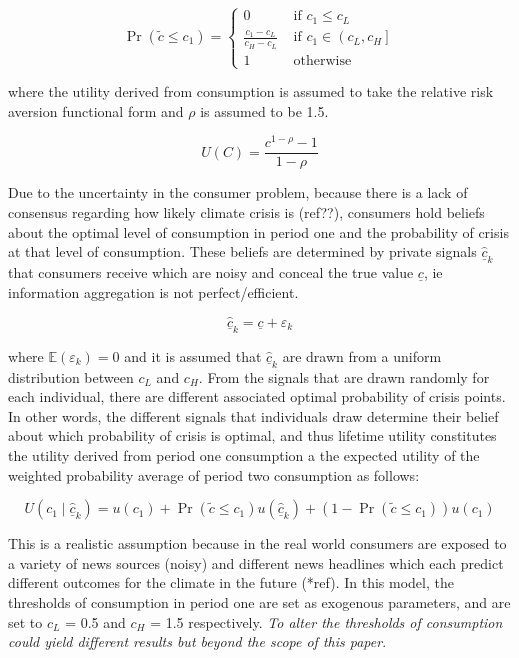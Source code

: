 \documentclass[11pt,preprint, authoryear]{elsarticle}
\numberwithin{equation}{section}
\numberwithin{figure}{section}
\numberwithin{table}{section}
\begin{document}
\[
\operatorname{Pr}\left(\tilde{c} \leq c_1\right)=\left\{\begin{array}{cc}
0 & \text { if } c_1 \leq c_L \\
\frac{c_1-c_L}{c_H-c_L} & \text { if } c_1 \in\left(c_L, c_H\right] \\
1 & \text { otherwise }
\end{array}\right.
\]

where the utility derived from consumption is assumed to take the
relative risk aversion functional form and \(\rho\) is assumed to be
1.5.

\[
U(C)=\frac{c^{1-\rho}-1}{1-\rho}
\]

Due to the uncertainty in the consumer problem, because there is a lack
of consensus regarding how likely climate crisis is (ref??), consumers
hold beliefs about the optimal level of consumption in period one and
the probability of crisis at that level of consumption. These beliefs
are determined by private signals \(\hat{\underline{c}}_k\) that
consumers receive which are noisy and conceal the true value
\(\underline{c}\), ie information aggregation is not perfect/efficient.

\[
\hat{\underline{c}}_k=\underline{c}+\varepsilon_k
\]

where \(\mathbb{E}\left(\varepsilon_k\right)=0\) and it is assumed that
\(\hat{\underline{c}}_k\) are drawn from a uniform distribution between
\(c_L\) and \(c_H\). From the signals that are drawn randomly for each
individual, there are different associated optimal probability of crisis
points. In other words, the different signals that individuals draw
determine their belief about which probability of crisis is optimal, and
thus lifetime utility constitutes the utility derived from period one
consumption a the expected utility of the weighted probability average
of period two consumption as follows:

\[
U\left(c_1 \mid \hat{\underline{c}}_{k}\right)=u\left(c_1\right)+\operatorname{Pr}\left(\tilde{c} \leq c_1\right) u\left(\hat{\underline{c}}_{k}\right)+\left(1-\operatorname{Pr}\left(\tilde{c} \leq c_1\right)\right) u\left(c_1\right)
\]

This is a realistic assumption because in the real world consumers are
exposed to a variety of news sources (noisy) and different news
headlines which each predict different outcomes for the climate in the
future (*ref). In this model, the thresholds of consumption in period
one are set as exogenous parameters, and are set to \(c_L\) = 0.5 and
\(c_H\) = 1.5 respectively. \emph{To alter the thresholds of consumption
could yield different results but beyond the scope of this paper}.
\end{document}
